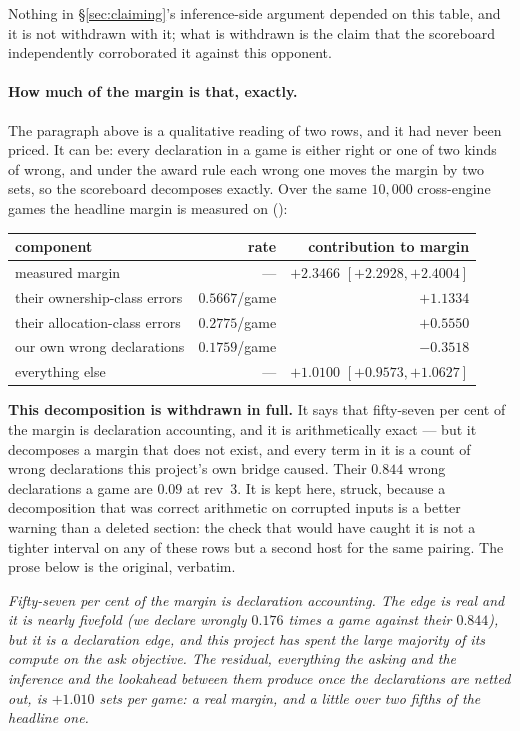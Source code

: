 \documentclass[11pt,letterpaper]{article}
\begin{document}
Nothing in \S\ref{sec:claiming}'s inference-side argument depended on this
table, and it is not withdrawn with it; what is withdrawn is the claim that
the scoreboard independently corroborated it against this opponent.

\paragraph{How much of the margin is that, exactly.}
\label{sec:res-headline} The paragraph above is a
qualitative reading of two rows, and it had never been priced. It can be:
every declaration in a game is either right or one of two kinds of wrong, and
under the award rule each wrong one moves the margin by two sets, so the
scoreboard decomposes exactly. Over the same $10{,}000$ cross-engine games
the headline margin is measured on
():

\begin{center}
\small
\begin{tabular}{lrr}
\toprule
component & rate & contribution to margin \\
\midrule
measured margin & --- & $+2.3466$ $[+2.2928, +2.4004]$ \\
their ownership-class errors & $0.5667$/game & $+1.1334$ \\
their allocation-class errors & $0.2775$/game & $+0.5550$ \\
our own wrong declarations & $0.1759$/game & $-0.3518$ \\
\midrule
everything else & --- & $+1.0100$ $[+0.9573, +1.0627]$ \\
\bottomrule
\end{tabular}
\end{center}

\noindent \textbf{This decomposition is withdrawn in full.} It says that
fifty-seven per cent of the margin is declaration accounting, and it is
arithmetically exact --- but it decomposes a margin that does not exist, and
every term in it is a count of wrong declarations this project's own bridge
caused. Their $0.844$ wrong declarations a game are $0.09$ at rev~3. It is
kept here, struck, because a decomposition that was correct arithmetic on
corrupted inputs is a better warning than a deleted section: the check that
would have caught it is not a tighter interval on any of these rows but a
second host for the same pairing. The prose below is the original, verbatim.

\emph{Fifty-seven per cent of the margin is declaration accounting.
The edge is real and it is nearly fivefold (we declare wrongly
$0.176$ times a game against their $0.844$), but it is a \emph{declaration}
edge, and
this project has spent the large majority of its compute on the ask objective.
The residual, everything the asking and the inference and the lookahead
between them produce once the declarations are netted out, is $+1.010$ sets
per game: a real margin, and a little over two fifths of the headline one.}
\end{document}
